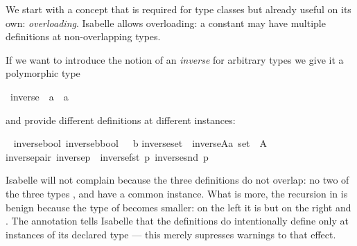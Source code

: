 %
\begin{isabellebody}%
\def\isabellecontext{Overloading{\isadigit{0}}}%
%
\begin{isamarkuptext}%
We start with a concept that is required for type classes but already
useful on its own: \emph{overloading}. Isabelle allows overloading: a
constant may have multiple definitions at non-overlapping types.%
\end{isamarkuptext}%
%
%
\begin{isamarkuptext}%
If we want to introduce the notion of an \emph{inverse} for arbitrary types we
give it a polymorphic type%
\end{isamarkuptext}%
\ inverse\ {\isacharcolon}{\isacharcolon}\ {\isachardoublequote}{\isacharprime}a\ {\isasymRightarrow}\ {\isacharprime}a{\isachardoublequote}%
\begin{isamarkuptext}%
\noindent
and provide different definitions at different instances:%
\end{isamarkuptext}%
\ {\isacharparenleft}\isanewline
inverse{\isacharunderscore}bool{\isacharcolon}\ {\isachardoublequote}inverse{\isacharparenleft}b{\isacharcolon}{\isacharcolon}bool{\isacharparenright}\ {\isasymequiv}\ {\isasymnot}\ b{\isachardoublequote}\isanewline
inverse{\isacharunderscore}set{\isacharcolon}\ \ {\isachardoublequote}inverse{\isacharparenleft}A{\isacharcolon}{\isacharcolon}{\isacharprime}a\ set{\isacharparenright}\ {\isasymequiv}\ {\isacharminus}A{\isachardoublequote}\isanewline
inverse{\isacharunderscore}pair{\isacharcolon}\ {\isachardoublequote}inverse{\isacharparenleft}p{\isacharparenright}\ {\isasymequiv}\ {\isacharparenleft}inverse{\isacharparenleft}fst\ p{\isacharparenright}{\isacharcomma}\ inverse{\isacharparenleft}snd\ p{\isacharparenright}{\isacharparenright}{\isachardoublequote}%
\begin{isamarkuptext}%
\noindent
Isabelle will not complain because the three definitions do not overlap: no
two of the three types ,  and  have a
common instance. What is more, the recursion in  is
benign because the type of  becomes smaller: on the left it is
 but on the right  and . The annotation  tells Isabelle that the definitions do
intentionally define  only at instances of its declared type
 --- this merely supresses warnings to that effect.


\end{isamarkuptext}
\end{isabellebody}
